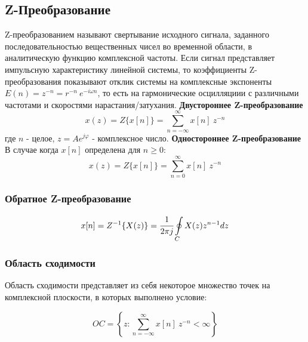 \documentclass[12pt, a6paper]{extarticle}
\begin{document}
\newpage
\subsection{Z-Преобразование}
Z-преобразованием называют свертывание исходного сигнала, заданного последовательностью вещественных чисел во временной области, в аналитическую функцию комплексной частоты. Если сигнал представляет импульсную характеристику линейной системы, то коэффициенты Z-преобразования показывают отклик системы на комплексные экспоненты $E(n) = z^{-n} = r^{-n}\ e^{-i \omega n}$, то есть на гармонические осцилляциии с различными частотами и скоростями нарастания/затухания.
\newline\newline
\textbf{Двустороннее Z-преобразование} \newline
$$ x(z) = Z\{x[n]\} = \sum\limits_{n=-\infty}^{\infty}{x[n]\ z^{-n}}$$
где $n$ - целое, $z = Ae^{j\varphi}$ - комплексное число.
\newline\newline
\textbf{Одностороннее Z-преобразование} \newline
В случае когда $x[n]$ определена для $n \ge 0$:
$$ x(z) = Z\{x[n]\} = \sum\limits_{n=0}^{\infty}{x[n]\ z^{-n}}$$

\subsubsection{Обратное Z-преобразование}

$$ x[n] = Z^{-1}\{X(z)\} = \cfrac{1}{2\pi j} \oint\limits_C{X(z)z^{n-1}dz} $$


\subsubsection{Область сходимости}
Область сходимости представляет из себя некоторое множество точек на комплексной плоскости, в которых выполнено условие:

$$ OC = \left\{ z : \sum\limits_{n=-\infty}^{\infty}{x[n]\ z^{-n}} < \infty  \right\} $$

\newpage
\end{document}
